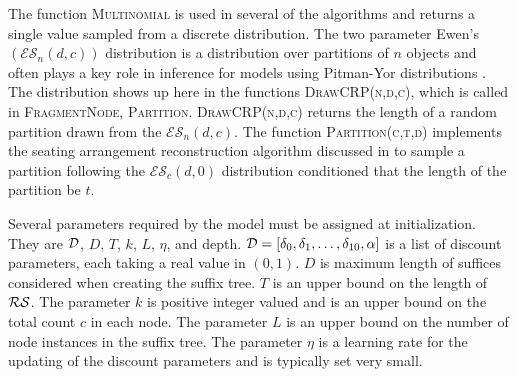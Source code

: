 
The function \textsc{Multinomial} is used in several of the algorithms and returns a single value sampled from a discrete distribution.  The two parameter Ewen's $(\mathcal{E}\mathcal{S}_{n}(d,c))$ distribution is a distribution over partitions of $n$ objects and often plays a key role in inference for models using Pitman-Yor distributions \cite{Ewens_dist_ref}.  The  distribution shows up here in the functions \textsc{DrawCRP(n,d,c)}, which is called in \textsc{FragmentNode}, \textsc{Partition}.   \textsc{DrawCRP(n,d,c)} returns the length of a random partition drawn from the $\mathcal{E}\mathcal{S}_{n}(d,c)$.  The function \textsc{Partition(c,t,d)} implements the seating arrangement reconstruction algorithm discussed in \citep{Gasthaus2011} to sample a partition following the $\mathcal{E}\mathcal{S}_{c}(d,0)$ distribution conditioned that the length of the partition be $t$.

Several parameters required by the model must be assigned at initialization.  They are $\D$, $D$, $T$, $k$, $L$, $\eta$,  and depth.  $\D = [\dd_0, \dd_1, \ldots, \dd_{10}, \alpha]$ is a list of discount parameters, each taking a real value in $(0,1)$.  $D$ is maximum length of suffices considered when creating the suffix tree.  $T$ is an upper bound on the length of $\RS$.  The parameter $k$ is positive integer valued and is an upper bound on the total count $c$ in each node.  The parameter $L$ is an upper bound on the number of node instances in the suffix tree. The parameter $\eta$ is a learning rate for the updating of the discount parameters and is typically set very small.  

